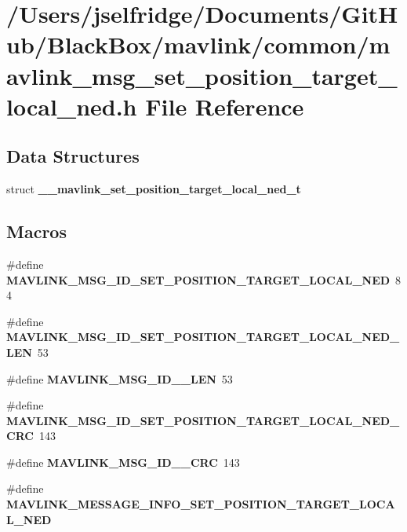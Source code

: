 \section{/\+Users/jselfridge/\+Documents/\+Git\+Hub/\+Black\+Box/mavlink/common/mavlink\+\_\+msg\+\_\+set\+\_\+position\+\_\+target\+\_\+local\+\_\+ned.h File Reference}
\label{mavlink__msg__set__position__target__local__ned_8h}
\subsection*{Data Structures}
\begin{DoxyCompactItemize}
\item 
struct \textbf{ \+\_\+\+\_\+mavlink\+\_\+set\+\_\+position\+\_\+target\+\_\+local\+\_\+ned\+\_\+t}
\end{DoxyCompactItemize}
\subsection*{Macros}
\begin{DoxyCompactItemize}
\item 
\#define \textbf{ M\+A\+V\+L\+I\+N\+K\+\_\+\+M\+S\+G\+\_\+\+I\+D\+\_\+\+S\+E\+T\+\_\+\+P\+O\+S\+I\+T\+I\+O\+N\+\_\+\+T\+A\+R\+G\+E\+T\+\_\+\+L\+O\+C\+A\+L\+\_\+\+N\+ED}~84
\item 
\#define \textbf{ M\+A\+V\+L\+I\+N\+K\+\_\+\+M\+S\+G\+\_\+\+I\+D\+\_\+\+S\+E\+T\+\_\+\+P\+O\+S\+I\+T\+I\+O\+N\+\_\+\+T\+A\+R\+G\+E\+T\+\_\+\+L\+O\+C\+A\+L\+\_\+\+N\+E\+D\+\_\+\+L\+EN}~53
\item 
\#define \textbf{ M\+A\+V\+L\+I\+N\+K\+\_\+\+M\+S\+G\+\_\+\+I\+D\+\_\+\_\+\+L\+EN}~53
\item 
\#define \textbf{ M\+A\+V\+L\+I\+N\+K\+\_\+\+M\+S\+G\+\_\+\+I\+D\+\_\+\+S\+E\+T\+\_\+\+P\+O\+S\+I\+T\+I\+O\+N\+\_\+\+T\+A\+R\+G\+E\+T\+\_\+\+L\+O\+C\+A\+L\+\_\+\+N\+E\+D\+\_\+\+C\+RC}~143
\item 
\#define \textbf{ M\+A\+V\+L\+I\+N\+K\+\_\+\+M\+S\+G\+\_\+\+I\+D\+\_\+\_\+\+C\+RC}~143
\item 
\#define \textbf{ M\+A\+V\+L\+I\+N\+K\+\_\+\+M\+E\+S\+S\+A\+G\+E\+\_\+\+I\+N\+F\+O\+\_\+\+S\+E\+T\+\_\+\+P\+O\+S\+I\+T\+I\+O\+N\+\_\+\+T\+A\+R\+G\+E\+T\+\_\+\+L\+O\+C\+A\+L\+\_\+\+N\+ED}
\end{DoxyCompactItemize}
